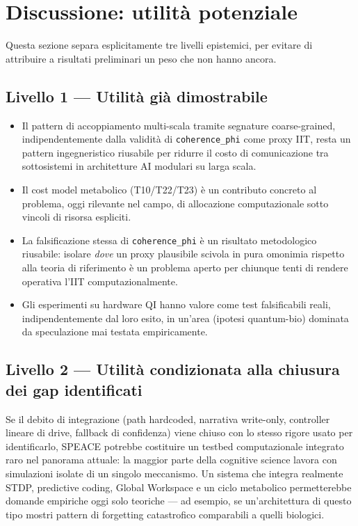 \documentclass[11pt,a4paper]{article}
\newcommand{\code}[1]{\texttt{#1}}
\newcommand{\coherencephi}{\code{coherence\_phi}}
\begin{document}
\section{Discussione: utilit\`a potenziale}
\label{sec:discussion}

Questa sezione separa esplicitamente tre livelli epistemici, per evitare di attribuire a risultati preliminari un peso che non hanno ancora.

\subsection{Livello 1 --- Utilit\`a gi\`a dimostrabile}

\begin{itemize}
  \item Il pattern di accoppiamento multi-scala tramite segnature coarse-grained, indipendentemente dalla validit\`a di \coherencephi{} come proxy IIT, resta un pattern ingegneristico riusabile per ridurre il costo di comunicazione tra sottosistemi in architetture AI modulari su larga scala.
  \item Il cost model metabolico (T10/T22/T23) \`e un contributo concreto al problema, oggi rilevante nel campo, di allocazione computazionale sotto vincoli di risorsa espliciti.
  \item La falsificazione stessa di \coherencephi{} \`e un risultato metodologico riusabile: isolare \emph{dove} un proxy plausibile scivola in pura omonimia rispetto alla teoria di riferimento \`e un problema aperto per chiunque tenti di rendere operativa l'IIT computazionalmente.
  \item Gli esperimenti su hardware QI hanno valore come test falsificabili reali, indipendentemente dal loro esito, in un'area (ipotesi quantum-bio) dominata da speculazione mai testata empiricamente.
\end{itemize}

\subsection{Livello 2 --- Utilit\`a condizionata alla chiusura dei gap identificati}

Se il debito di integrazione (path hardcoded, narrativa write-only, controller lineare di drive, fallback di confidenza) viene chiuso con lo stesso rigore usato per identificarlo, SPEACE potrebbe costituire un testbed computazionale integrato raro nel panorama attuale: la maggior parte della cognitive science lavora con simulazioni isolate di un singolo meccanismo. Un sistema che integra realmente STDP, predictive coding, Global Workspace e un ciclo metabolico permetterebbe domande empiriche oggi solo teoriche --- ad esempio, se un'architettura di questo tipo mostri pattern di forgetting catastrofico comparabili a quelli biologici.
\end{document}
